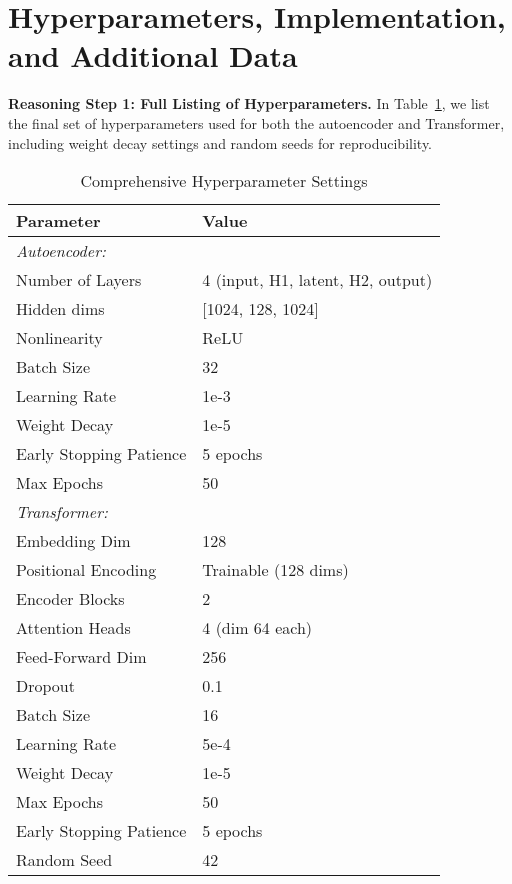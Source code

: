 \documentclass[journal]{IEEEtran}
\newcommand{\tabref}[1]{Table~\ref{#1}}
\begin{document}
\appendices
\section{Hyperparameters, Implementation, and Additional Data}
\label{app:hyperparam}

\textbf{Reasoning Step 1: Full Listing of Hyperparameters.}
In \tabref{tab:hyperparams2}, we list the final set of hyperparameters used for both the autoencoder and Transformer, including weight decay settings and random seeds for reproducibility. 

\begin{table}[H]
\centering
\caption{Comprehensive Hyperparameter Settings}
\label{tab:hyperparams2}
\begin{tabular}{@{}ll@{}}
\toprule
\textbf{Parameter} & \textbf{Value} \\
\midrule
\multicolumn{2}{l}{\textit{Autoencoder:}} \\
\quad Number of Layers          & 4 (input, H1, latent, H2, output) \\
\quad Hidden dims               & [1024, 128, 1024] \\
\quad Nonlinearity             & ReLU \\
\quad Batch Size                & 32 \\
\quad Learning Rate            & 1e-3 \\
\quad Weight Decay             & 1e-5 \\
\quad Early Stopping Patience  & 5 epochs \\
\quad Max Epochs               & 50 \\
\midrule
\multicolumn{2}{l}{\textit{Transformer:}} \\
\quad Embedding Dim            & 128 \\
\quad Positional Encoding      & Trainable (128 dims) \\
\quad Encoder Blocks           & 2 \\
\quad Attention Heads          & 4 (dim 64 each) \\
\quad Feed-Forward Dim         & 256 \\
\quad Dropout                  & 0.1 \\
\quad Batch Size               & 16 \\
\quad Learning Rate            & 5e-4 \\
\quad Weight Decay             & 1e-5 \\
\quad Max Epochs               & 50 \\
\quad Early Stopping Patience  & 5 epochs \\
\quad Random Seed              & 42 \\
\bottomrule
\end{tabular}
\end{table}
\end{document}
